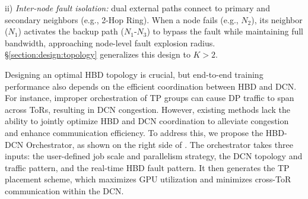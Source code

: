 ii) \textit{Inter-node fault isolation: } dual external paths connect to primary and secondary neighbors (e.g., 2-Hop Ring). When a node fails (e.g., $N_2$), its neighbor ($N_1$) activates the backup path ($N_1$-$N_3$) to bypass the fault while maintaining full bandwidth, approaching node-level fault explosion radius. \S\ref{section:design:topology} generalizes this design to $K>2$.


Designing an optimal HBD topology is crucial, but end-to-end training performance also depends on the efficient coordination between HBD and DCN. For instance, improper orchestration of TP groups can cause DP traffic to span across ToRs, resulting in DCN congestion. However, existing methods lack the ability to jointly optimize HBD and DCN coordination to alleviate congestion and enhance communication efficiency.
To address this, we propose the HBD-DCN Orchestrator, as shown on the right side of . The orchestrator takes three inputs: the user-defined job scale and parallelism strategy, the DCN topology and traffic pattern, and the real-time HBD fault pattern. It then generates the TP placement scheme, which maximizes GPU utilization and minimizes cross-ToR communication within the DCN.



